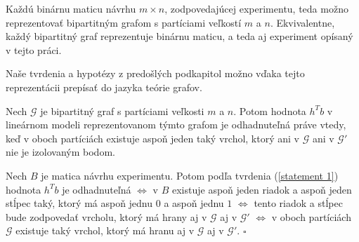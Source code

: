 \begin{center}


\end{center}

Každú binárnu maticu návrhu $m \times n$, zodpovedajúcej experimentu, teda možno reprezentovať bipartitným grafom s partíciami veľkostí $m$ a $n$. 
Ekvivalentne, každý bipartitný graf reprezentuje binárnu maticu, a teda aj experiment opísaný v tejto práci.

Naše tvrdenia a hypotézy z predošlých podkapitol možno vďaka tejto reprezentácii prepísať do jazyka teórie grafov.

\begin{prop}
Nech $\mathcal{G}$ je bipartitný graf s partíciami veľkosti $m$ a $n$. 
Potom hodnota $h^T b$ v lineárnom modeli reprezentovanom týmto grafom je odhadnuteľná práve vtedy,
keď v oboch partíciách existuje aspoň jeden taký vrchol, ktorý ani v $\mathcal{G}$ ani v $\mathcal{G}'$ nie je izolovaným bodom.
\end{prop}

\begin{dokaz}
Nech $B$ je matica návrhu experimentu. Potom podľa tvrdenia (\ref{statement 1})
hodnota $h^T b$ je odhadnuteľná $\Leftrightarrow$ v $B$ existuje aspoň jeden riadok a aspoň jeden stĺpec taký,
ktorý má aspoň jednu $0$ a aspoň jednu $1$ $\Leftrightarrow$ tento riadok a stĺpec bude zodpovedať vrcholu,
ktorý má hrany aj v $\mathcal{G}$ aj v $\mathcal{G}'$ $\Leftrightarrow$ v oboch partíciách $\mathcal{G}$ existuje taký vrchol, ktorý má hranu aj v $\mathcal{G}$ aj v $\mathcal{G}'$. $\square$
\end{dokaz}

